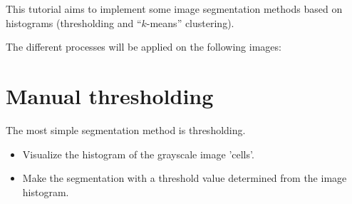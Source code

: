 \def\difficulty{1}
\begin{note}This tutorial aims to implement some image segmentation methods based on histograms (thresholding and ``$k$-means'' clustering).\end{note}

\noindent The different processes will be applied on the following images:
{\makeatletter
	\renewcommand\fs@ruled{\def\@fs@cfont{\bfseries}\let\@fs@capt\floatc@ruled
		\def\@fs@pre{\hrule height.8pt depth0pt \kern2pt}%
		\def\@fs@post{\kern2pt\hrule\relax}%
		\def\@fs@mid{\vskip2pt}%
		\let\@fs@iftopcapt\iftrue}
	\makeatother
\begin{figure}[htbp]
\centering
{}\hspace{1cm}
\vspace*{-10pt}
\end{figure}}


\vspace*{-10pt}

\section{Manual thresholding}
The most simple segmentation method is thresholding.
\begin{qbox} 
\begin{itemize}
 \item Visualize the histogram of the grayscale image 'cells'.
 \item Make the segmentation with a threshold value determined from the image histogram.
\end{itemize}

\end{qbox}



